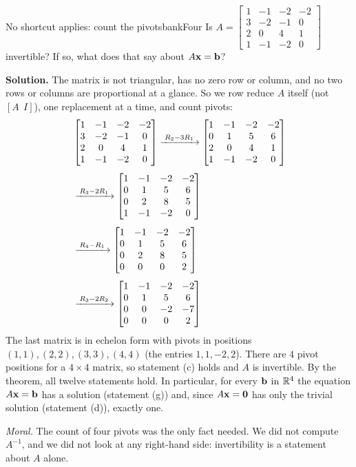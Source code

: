 \documentclass[11pt]{article}
\begin{document}
\begin{exmp}{No shortcut applies: count the pivots}{bankFour}
Is $A=\begin{bmatrix}1&-1&-2&-2\\3&-2&-1&0\\2&0&4&1\\1&-1&-2&0\end{bmatrix}$ invertible? If so, what does that say about $A\mathbf{x}=\mathbf{b}$?

\textbf{Solution.} The matrix is not triangular, has no zero row or column, and no two rows or columns are proportional at a glance. So we row reduce $A$ itself (not $[A\ \ I]$), one replacement at a time, and count pivots:
\begin{align*}
&\begin{bmatrix}1&-1&-2&-2\\3&-2&-1&0\\2&0&4&1\\1&-1&-2&0\end{bmatrix}
\xrightarrow{\;R_2-3R_1\;}
\begin{bmatrix}1&-1&-2&-2\\0&1&5&6\\2&0&4&1\\1&-1&-2&0\end{bmatrix}\\[4pt]
&\xrightarrow{\;R_3-2R_1\;}
\begin{bmatrix}1&-1&-2&-2\\0&1&5&6\\0&2&8&5\\1&-1&-2&0\end{bmatrix}\\[4pt]
&\xrightarrow{\;R_4-R_1\;}
\begin{bmatrix}1&-1&-2&-2\\0&1&5&6\\0&2&8&5\\0&0&0&2\end{bmatrix}\\[4pt]
&\xrightarrow{\;R_3-2R_2\;}
\begin{bmatrix}1&-1&-2&-2\\0&1&5&6\\0&0&-2&-7\\0&0&0&2\end{bmatrix}
\end{align*}
The last matrix is in echelon form with pivots in positions $(1,1),(2,2),(3,3),(4,4)$ (the entries $1,1,-2,2$). There are $4$ pivot positions for a $4\times4$ matrix, so statement (c) holds and $A$ is invertible. By the theorem, all twelve statements hold. In particular, for every $\mathbf{b}$ in $\mathbb{R}^4$ the equation $A\mathbf{x}=\mathbf{b}$ has a solution (statement (g)) and, since $A\mathbf{x}=\mathbf{0}$ has only the trivial solution (statement (d)), exactly one.

\emph{Moral.} The count of four pivots was the only fact needed. We did not compute $A^{-1}$, and we did not look at any right-hand side: invertibility is a statement about $A$ alone.
\end{exmp}
\end{document}
